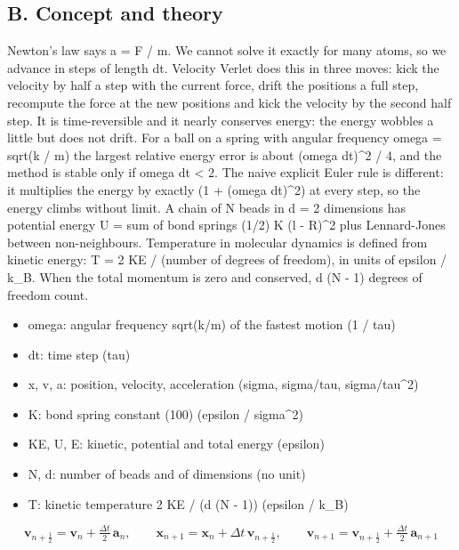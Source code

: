 \documentclass[11pt,a4paper]{article}
\begin{document}
\subsection*{B. Concept and theory}
Newton's law says a = F / m. We cannot solve it exactly for many atoms, so we advance in steps of length dt. Velocity Verlet does this in three moves: kick the velocity by half a step with the current force, drift the positions a full step, recompute the force at the new positions and kick the velocity by the second half step. It is time-reversible and it nearly conserves energy: the energy wobbles a little but does not drift. For a ball on a spring with angular frequency omega = sqrt(k / m) the largest relative energy error is about (omega dt)\textasciicircum{}2 / 4, and the method is stable only if omega dt \textless{} 2. The naive explicit Euler rule is different: it multiplies the energy by exactly (1 + (omega dt)\textasciicircum{}2) at every step, so the energy climbs without limit. A chain of N beads in d = 2 dimensions has potential energy U = sum of bond springs (1/2) K (l - R)\textasciicircum{}2 plus Lennard-Jones between non-neighbours. Temperature in molecular dynamics is defined from kinetic energy: T = 2 KE / (number of degrees of freedom), in units of epsilon / k\_B. When the total momentum is zero and conserved, d (N - 1) degrees of freedom count.

\begin{itemize}[nosep]
\item omega: angular frequency sqrt(k/m) of the fastest motion (1 / tau)
\item dt: time step (tau)
\item x, v, a: position, velocity, acceleration (sigma, sigma/tau, sigma/tau\textasciicircum{}2)
\item K: bond spring constant (100) (epsilon / sigma\textasciicircum{}2)
\item KE, U, E: kinetic, potential and total energy (epsilon)
\item N, d: number of beads and of dimensions (no unit)
\item T: kinetic temperature 2 KE / (d (N - 1)) (epsilon / k\_B)
\end{itemize}

\begin{equation*}
\mathbf v_{n+\frac12}=\mathbf v_n+\tfrac{\Delta t}{2}\,\mathbf a_n,\qquad \mathbf x_{n+1}=\mathbf x_n+\Delta t\,\mathbf v_{n+\frac12},\qquad \mathbf v_{n+1}=\mathbf v_{n+\frac12}+\tfrac{\Delta t}{2}\,\mathbf a_{n+1}
\end{equation*}
\end{document}
